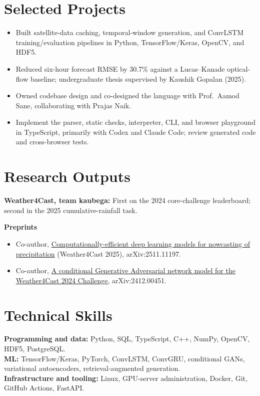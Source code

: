 \section{Selected Projects}
\begin{itemize}
  \item Built satellite-data caching, temporal-window generation, and ConvLSTM training/evaluation pipelines in Python, TensorFlow/Keras, OpenCV, and HDF5.
  \item Reduced six-hour forecast RMSE by 30.7\% against a Lucas--Kanade optical-flow baseline; undergraduate thesis supervised by Kaushik Gopalan (2025).
\end{itemize}
\begin{itemize}
  \item Owned codebase design and co-designed the language with Prof.\ Aamod Sane, collaborating with Prajas Naik.
  \item Implement the parser, static checks, interpreter, CLI, and browser playground in TypeScript, primarily with Codex and Claude Code; review generated code and cross-browser tests.
\end{itemize}
\section{Research Outputs}
\textbf{Weather4Cast, team kaubega:} First on the 2024 core-challenge leaderboard; second in the 2025 cumulative-rainfall task.\par
\textbf{Preprints}\par
\begin{itemize}
  \item Co-author, \href{https://arxiv.org/abs/2511.11197}{Computationally-efficient deep learning models for nowcasting of precipitation} (Weather4Cast 2025), arXiv:2511.11197.
  \item Co-author, \href{https://arxiv.org/abs/2412.00451}{A conditional Generative Adversarial network model for the Weather4Cast 2024 Challenge}, arXiv:2412.00451.
\end{itemize}
\section{Technical Skills}
\textbf{Programming and data:} Python, SQL, TypeScript, C++, NumPy, OpenCV, HDF5, PostgreSQL.\\
\textbf{ML:} TensorFlow/Keras, PyTorch, ConvLSTM, ConvGRU, conditional GANs, variational autoencoders, retrieval-augmented generation.\\
\textbf{Infrastructure and tooling:} Linux, GPU-server administration, Docker, Git, GitHub Actions, FastAPI.

